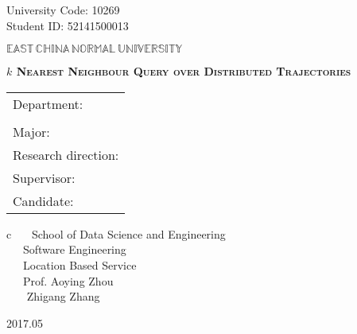\newpage

\pagestyle{empty}

\hskip 1.83cm {\large University Code: 10269}\\
\hspace*{\fill} {\large Student ID: 52141500013}

\vskip 2cm

\begin{center}
{\Huge $\mathbb{EAST}\,\mathbb{CHINA}\,\mathbb{NORMAL}\,
\mathbb{UNIVERSITY}$}
\end{center}

\vskip 3cm

\begin{center}
\bfseries{\scshape{\huge  $k$ Nearest Neighbour Query over  Distributed Trajectories}}\\
\end{center}

\vskip 2cm {\large
\begin{center}
\begin{tabular}{l}
Department:\\
\\
Major:\\
Research direction:\\
Supervisor:\\
Candidate:
\end{tabular}
\begin{tabular}c
~~~School of Data Science and Engineering\\
\hline ~~~Software Engineering    \\
\hline ~~~Location Based  Service\\ 
\hline ~~~Prof.  Aoying Zhou\\
\hline ~~~  Zhigang Zhang\\
\hline
\end{tabular}
\end{center}}

\vskip 30mm

\begin{center}
{\Large 2017.05}
\end{center}
\clearpage
\phantom{s}
\clearpage